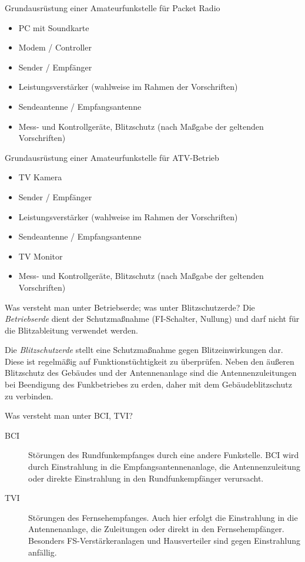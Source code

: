 \documentclass[avery5371,grid,frame,a4paper]{flashcards}
\newcommand{\card}[3]{
  \begin{flashcard}[{\chap} -- #1]{#2}#3\end{flashcard}
}
\begin{document}
\card{39}{Grundausrüstung einer Amateurfunkstelle für Packet Radio}{
  \begin{itemize}
    \item PC mit Soundkarte
    \item Modem / Controller
    \item Sender / Empfänger
    \item Leistungsverstärker (wahlweise im Rahmen der Vorschriften)
    \item Sendeantenne / Empfangsantenne
    \item Mess- und Kontrollgeräte, Blitzschutz (nach Maßgabe der geltenden Vorschriften)
  \end{itemize}
}
\card{40}{Grundausrüstung einer Amateurfunkstelle für ATV-Betrieb}{
  \begin{itemize}
    \item TV Kamera
    \item Sender / Empfänger
    \item Leistungsverstärker (wahlweise im Rahmen der Vorschriften)
    \item Sendeantenne / Empfangsantenne
    \item TV Monitor
    \item Mess- und Kontrollgeräte, Blitzschutz (nach Maßgabe der geltenden Vorschriften)
  \end{itemize}
}
\card{41}{Was versteht man unter Betriebserde; was unter Blitzschutzerde?}{
  Die \emph{Betriebserde} dient der Schutzmaßnahme (FI-Schalter, Nullung) und darf nicht für die Blitzableitung verwendet werden.

  Die \emph{Blitzschutzerde} stellt eine Schutzmaßnahme gegen Blitzeinwirkungen dar. Diese ist regelmäßig auf Funktionstüchtigkeit zu überprüfen. Neben den äußeren Blitzschutz des Gebäudes und der Antennenanlage sind die Antennenzuleitungen bei Beendigung des Funkbetriebes zu erden, daher mit dem Gebäudeblitzschutz zu verbinden.
}
\card{42}{Was versteht man unter BCI, TVI?}{
  \begin{description}
    \item[BCI] Störungen des Rundfunkempfanges durch eine andere Funkstelle. BCI wird durch Einstrahlung in die Empfangsantennenanlage, die Antennenzuleitung oder direkte Einstrahlung in den Rundfunkempfänger verursacht.
    \item[TVI] Störungen des Fernsehempfanges. Auch hier erfolgt die Einstrahlung in die Antennenanlage, die Zuleitungen oder direkt in den Fernsehempfänger. Besonders FS-Verstärkeranlagen und Hausverteiler sind gegen Einstrahlung anfällig.
  \end{description}
}
\end{document}
